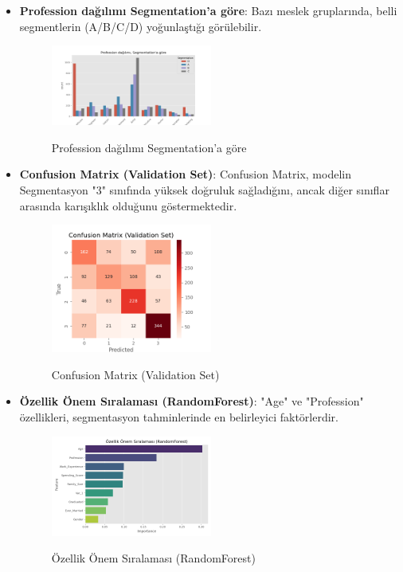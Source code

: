 \documentclass{article}
\begin{document}
\begin{itemize}
    \item \textbf{Profession dağılımı Segmentation'a göre}: Bazı meslek gruplarında, belli segmentlerin (A/B/C/D) yoğunlaştığı görülebilir.
    \begin{figure}[H]
    \centering
    {\shorthandoff{=}
    \includegraphics[width=0.5\textwidth]{plot_2024-12-28 15-13-04_3.png}
    }
    \caption{Profession dağılımı Segmentation'a göre}
    \end{figure}
        
    \item \textbf{Confusion Matrix (Validation Set)}: Confusion Matrix, modelin Segmentasyon "3" sınıfında yüksek doğruluk sağladığını, ancak diğer sınıflar arasında karışıklık olduğunu göstermektedir.
    \begin{figure}[H]
    \centering
    {\shorthandoff{=}
    \includegraphics[width=0.5\textwidth]{plot_2024-12-28 15-13-04_4.png}
    }
    \caption{Confusion Matrix (Validation Set)}
    \end{figure}
    
    \item \textbf{Özellik Önem Sıralaması (RandomForest)}: "Age" ve "Profession" özellikleri, segmentasyon tahminlerinde en belirleyici faktörlerdir.
    \begin{figure}[H]
    \centering
    {\shorthandoff{=}
    \includegraphics[width=0.5\textwidth]{plot_2024-12-28 15-13-04_5.png}
    }
    \caption{Özellik Önem Sıralaması (RandomForest)}
    \end{figure}

\end{itemize}
\end{document}
